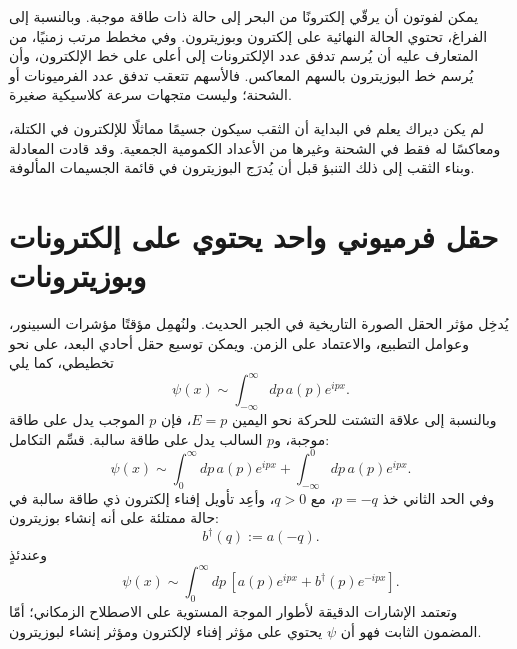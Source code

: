 يمكن لفوتون أن يرقّي إلكترونًا من البحر إلى حالة ذات طاقة موجبة. وبالنسبة إلى الفراغ، تحتوي الحالة النهائية على إلكترون وبوزيترون. وفي مخطط مرتب زمنيًا، من المتعارف عليه أن يُرسم تدفق عدد الإلكترونات إلى أعلى على خط الإلكترون، وأن يُرسم خط البوزيترون بالسهم المعاكس. فالأسهم تتعقب تدفق عدد الفرميونات أو الشحنة؛ وليست متجهات سرعة كلاسيكية صغيرة.

\begin{classroomqa}
\end{classroomqa}

لم يكن ديراك يعلم في البداية أن الثقب سيكون جسيمًا مماثلًا للإلكترون في الكتلة، ومعاكسًا له فقط في الشحنة وغيرها من الأعداد الكمومية الجمعية. وقد قادت المعادلة وبناء الثقب إلى ذلك التنبؤ قبل أن يُدرَج البوزيترون في قائمة الجسيمات المألوفة.

\section{حقل فرميوني واحد يحتوي على إلكترونات وبوزيترونات}

يُدخِل مؤثر الحقل الصورة التاريخية في الجبر الحديث. ولنُهمِل مؤقتًا مؤشرات السبينور، وعوامل التطبيع، والاعتماد على الزمن. ويمكن توسيع حقل أحادي البعد، على نحو تخطيطي، كما يلي
\begin{equation}
\psi(x)
\sim
\int_{-\infty}^{\infty}dp\,a(p)e^{ipx}.
\label{eq:l10-full-field-integral}
\end{equation}
وبالنسبة إلى علاقة التشتت للحركة نحو اليمين \(E=p\)، فإن \(p\) الموجب يدل على طاقة موجبة، و\(p\) السالب يدل على طاقة سالبة. قسِّم التكامل:
\begin{equation}
\psi(x)
\sim
\int_0^\infty dp\,a(p)e^{ipx}
+
\int_{-\infty}^0 dp\,a(p)e^{ipx}.
\end{equation}
وفي الحد الثاني خذ \(p=-q\)، مع \(q>0\)، وأعِد تأويل إفناء إلكترون ذي طاقة سالبة في حالة ممتلئة على أنه إنشاء بوزيترون:
\begin{equation}
b^\dagger(q):=a(-q).
\end{equation}
وعندئذٍ
\begin{equation}
\psi(x)
\sim
\int_0^\infty dp\,
\left[
a(p)e^{ipx}
+
b^\dagger(p)e^{-ipx}
\right].
\label{eq:l10-electron-positron-split}
\end{equation}
وتعتمد الإشارات الدقيقة لأطوار الموجة المستوية على الاصطلاح الزمكاني؛ أمّا المضمون الثابت فهو أن \(\psi\) يحتوي على مؤثر إفناء لإلكترون ومؤثر إنشاء لبوزيترون.

